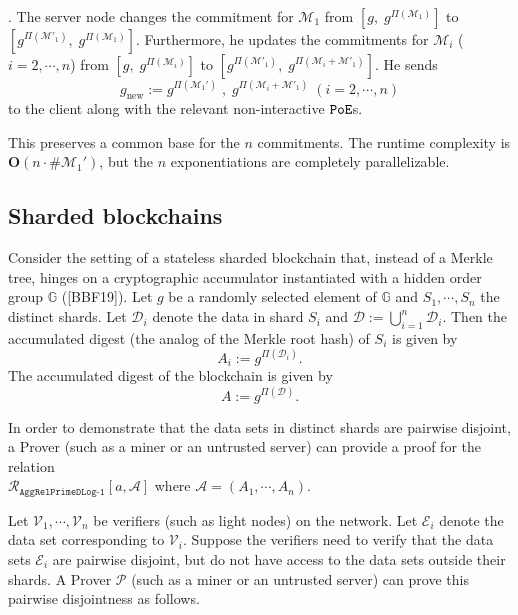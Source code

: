 \documentclass[11pt, lettersize, notitlepage, leqno, footskip=0.6cm]{article}
\newcommand{\ttt}{\texttt}
\newcommand{\mc}{\mathcal}
\newcommand{\mb}{\mathbb}
\newcommand{\mbf}{\mathbf}
\newcommand{\mr}{\mathrm}
\newcommand{\mP}{\mc{P}}
\newcommand{\V}{\mc{V}}
\newcommand{\vs}{\vspace{-0.15cm}}
\newcommand{\noin}{\noindent}
\numberwithin{equation}{section}
\begin{document}
\vspace{0.1cm}

\noin 3. The server node changes the commitment for $\mc{M}_1$ from $[g,\; g^{\Pi(\mc{M}_1)}]$ to\\ $[g^{\Pi(\mc{M}'_1)},\; g^{\Pi(\mc{M}_1)}]$. Furthermore, he updates the commitments for $\mc{M}_i$ ($i=2,\cdots,n$) from $[g,\; g^{\Pi(\mc{M}_i)}]$ to $[g^{\Pi(\mc{M}'_1)},\; g^{\Pi(\mc{M}_i+\mc{M}'_1)}]$. He sends \vs $$g_{\mr{new}}:= g^{\Pi(\mc{M}_1')}\;,\;g^{\Pi(\mc{M}_i+\mc{M}'_1)}\;(i=2,\cdots,n)$$ to the client along with the relevant non-interactive $\tt{PoE}$s.

This preserves a common base for the $n$ commitments. The runtime complexity is $\mbf{O}(n\cdot \#\mc{M}_1')$, but the $n$ exponentiations are completely parallelizable.




\bigskip

\subsection{\fontsize{11}{11} Sharded blockchains}

Consider the setting of a stateless sharded blockchain that, instead of a Merkle tree, hinges on a cryptographic accumulator instantiated with a hidden order group $\mb{G}$ ([BBF19]). Let $g$ be a randomly selected element of $\mb{G}$ and $S_1,\cdots, S_n$ the distinct shards. Let $\mc{D}_i$ denote the data in shard $S_i$ and $\mc{D}:= \bigcup\limits_{i=1}^n \mc{D}_i$. Then the accumulated digest (the analog of the Merkle root hash) of $S_i$ is given by \vs $$A_i:= g^{\Pi(\mc{D}_i)}.$$  The accumulated digest of the blockchain is given by \vs $$A:= g^{\Pi(\mc{D})}.$$

In order to demonstrate that the data sets in distinct shards are pairwise disjoint, a Prover (such as a miner or an untrusted server) can provide a proof for the relation\\ $\mc{R}_{\ttt{AggRelPrimeDLog-1}}[a, \mc{A}]$ where $\mc{A} = (A_1,\cdots,A_n)$.\vspace{0.2cm}

Let $\V_1,\cdots,\V_n$ be verifiers (such as light nodes) on the network. Let $\mc{E}_i$ denote the data set corresponding to $\V_i$. Suppose the verifiers need to verify that the data sets $\mc{E}_i$ are pairwise disjoint, but do not have access to the data sets outside their shards. A Prover $\mP$ (such as a miner or an untrusted server) can prove this pairwise disjointness as follows.\vspace{0.1cm}
\end{document}
